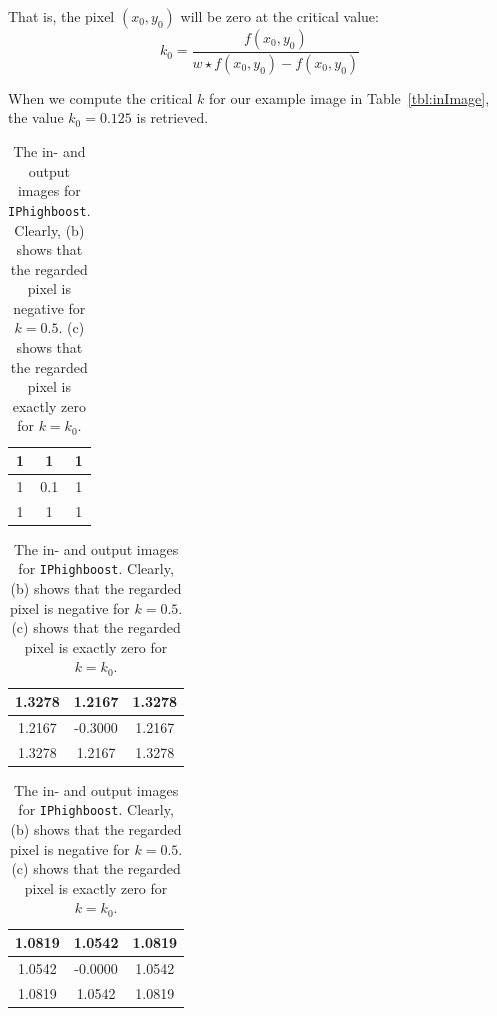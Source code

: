 That is, the pixel \((x_0, y_0)\) will be zero at the critical value:
\[k_0 = \frac{f(x_0, y_0)}{w \star f(x_0, y_0) - f(x_0, y_0)}\]

When we compute the critical \(k\) for our example image in Table~\ref{tbl:inImage}, the value \(k_0 = 0.125\) is retrieved.

\begin{table}[ht]
  \begin{minipage}[b]{.2\linewidth}
    \centering
    \begin{tabular}{|c|c|c|}\hline
    1 & 1 & 1 \\ \hline
    1 & 0.1 & 1 \\ \hline
    1 & 1 & 1 \\ \hline
    \end{tabular}
    \label{tbl:inImage}
  \end{minipage}
  \hfill
  \begin{minipage}[b]{.3\linewidth}
    \centering
    \begin{tabular}{|c|c|c|}\hline
      1.3278 & 1.2167 & 1.3278 \\ \hline
      1.2167 & -0.3000 & 1.2167 \\ \hline
      1.3278 & 1.2167 & 1.3278 \\ \hline
    \end{tabular}
    \label{tbl:outImage}
  \end{minipage}
  \hfill
  \begin{minipage}[b]{.4\linewidth}
    \centering
    \begin{tabular}{|c|c|c|}\hline
      1.0819 & 1.0542 & 1.0819 \\ \hline
      1.0542 & -0.0000 & 1.0542 \\ \hline
      1.0819 & 1.0542 & 1.0819 \\ \hline
    \end{tabular}
    \label{tbl:criticalImage}
  \end{minipage}
  \caption{The in- and output images for \texttt{IPhighboost}. Clearly, (b) shows that the regarded pixel is negative for \(k=0.5\). (c) shows that the regarded pixel is exactly zero for \(k=k_0\).}
  \hfill
\end{table}

\clearpage